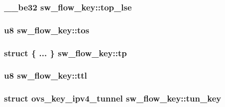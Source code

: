 \subsubsection[{top\+\_\+lse}]{\setlength{\rightskip}{0pt plus 5cm}\+\_\+\+\_\+be32 sw\+\_\+flow\+\_\+key\+::top\+\_\+lse}\label{structsw__flow__key_a8deabdad62023ba089b9864374cb5c20}
\hypertarget{structsw__flow__key_af82daee0da7b81a0e1333965ec3f6180}{}
\subsubsection[{tos}]{\setlength{\rightskip}{0pt plus 5cm}u8 sw\+\_\+flow\+\_\+key\+::tos}\label{structsw__flow__key_af82daee0da7b81a0e1333965ec3f6180}
\hypertarget{structsw__flow__key_a9c1944a39db1bf91141048df6d85ce8b}{}
\subsubsection[{tp}]{\setlength{\rightskip}{0pt plus 5cm}struct \{ ... \}   sw\+\_\+flow\+\_\+key\+::tp}\label{structsw__flow__key_a9c1944a39db1bf91141048df6d85ce8b}
\hypertarget{structsw__flow__key_aa53659c0aec0ef307046cb1d835ffa5a}{}
\subsubsection[{ttl}]{\setlength{\rightskip}{0pt plus 5cm}u8 sw\+\_\+flow\+\_\+key\+::ttl}\label{structsw__flow__key_aa53659c0aec0ef307046cb1d835ffa5a}
\hypertarget{structsw__flow__key_a2f87b7690c0cc2797f1f4347589472c3}{}
\subsubsection[{tun\+\_\+key}]{\setlength{\rightskip}{0pt plus 5cm}struct {\bf ovs\+\_\+key\+\_\+ipv4\+\_\+tunnel} sw\+\_\+flow\+\_\+key\+::tun\+\_\+key}\label{structsw__flow__key_a2f87b7690c0cc2797f1f4347589472c3}
\hypertarget{structsw__flow__key_a54b30752817dccb02665a7eecde52a72}{}
